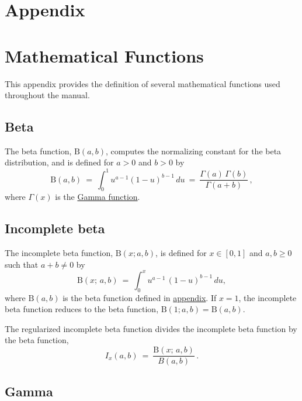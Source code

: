 \documentclass[
  10pt,
]{book}
\begin{document}
\hypertarget{appendix}{%
\chapter*{Appendix}\label{appendix}}

\hypertarget{math-functions}{%
\chapter{Mathematical Functions}\label{math-functions}}

This appendix provides the definition of several mathematical
functions used throughout the manual.

\hypertarget{beta-appendix}{%
\section{Beta}\label{beta-appendix}}

The beta function, \(\text{B}(a, b)\), computes the normalizing
constant for the beta distribution, and is defined for \(a > 0\) and \(b > 0\) by \[ \text{B}(a,b) \ = \ \int_0^1 u^{a - 1} (1 - u)^{b - 1} \,
du \ = \ \frac{\Gamma(a) \, \Gamma(b)}{\Gamma(a+b)} \, , \]
where \(\Gamma(x)\) is the \protect\hyperlink{gamma-appendix}{Gamma function}.

\hypertarget{inc-beta-appendix}{%
\section{Incomplete beta}\label{inc-beta-appendix}}

The incomplete beta function, \(\text{B}(x; a, b)\), is defined for \(x \in [0, 1]\) and \(a, b \geq 0\) such that \(a + b \neq 0\) by \[
\text{B}(x; \, a, b) \ = \ \int_0^x u^{a - 1} \, (1 - u)^{b - 1} \,
du, \] where \(\text{B}(a, b)\) is the beta function defined in
\protect\hyperlink{beta-appendix}{appendix}. If \(x = 1\), the incomplete beta function
reduces to the beta function, \(\text{B}(1; a, b) = \text{B}(a, b)\).

The regularized incomplete beta function divides the incomplete beta
function by the beta function, \[ I_x(a, b) \ = \ \frac{\text{B}(x; \,
a, b)}{B(a, b)} \, . \]

\hypertarget{gamma-appendix}{%
\section{Gamma}\label{gamma-appendix}}
\end{document}
